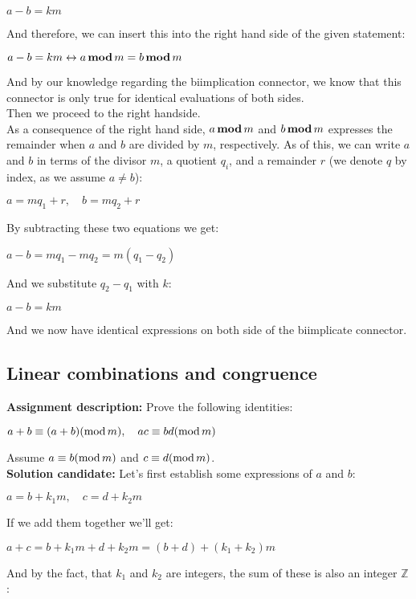 \documentclass{report}
\newcommand{\cent}[1]{\begin{center}#1\end{center}}
\newcommand{\doubleZ}{\mathbb{Z}}
\newcommand{\assignmentDescription}{\textbf{Assignment description: }}
\newcommand{\solution}{\textbf{Solution candidate: }}
\newcommand{\QED}{\boxed{}}
\newcommand{\modInline}{\text{mod\,}}
\newcommand{\modFunc}{\text{\,\textbf{mod}\,}}
\begin{document}
 	\cent{$a-b = km$}
 	
 	And therefore, we can insert this into the right hand side of the given statement:
 	
 	\cent{$a-b=km \leftrightarrow a \modFunc m = b \modFunc m$}
 	
 	And by our knowledge regarding the biimplication connector, we know that this connector is only true for identical evaluations of both sides.\\
 	
 	Then we proceed to the right handside.\\
 	
 	As a consequence of the right hand side, $a \modFunc m$ and $b \modFunc m$ expresses the remainder when $a$ and $b$ are divided by $m$, respectively. As of this, we can write $a$ and $b$ in terms of the divisor $m$, a quotient $q_i$, and a remainder $r$ (we denote $q$ by index, as we assume $a\neq b$):
 	
 	\cent{$a = m q_1 + r, \quad b = m q_2 + r$}
	
	By subtracting these two equations we get:
	
	\cent{$a - b = mq_1 - mq_2 = m(q_1 - q_2)$}
	
	And we substitute $q_2 -q_1$ with $k$:
	
	\cent{$a-b=km$}
	
	
	And we now have identical expressions on both side of the biimplicate connector.\\
	\QED
	
	\subsection{Linear combinations and congruence}
	
	\assignmentDescription
	Prove the following identities:
	
	\cent{$a+b \equiv (a+b) (\modInline m), \quad ac \equiv bd (\modInline m)$}
	
	Assume $a\equiv b (\modInline m)$ and $c \equiv d (\modInline m)$.\\
	
	\solution
	Let's first establish some expressions of $a$ and $b$:
	
	\cent{$a = b + k_1m, \quad c = d + k_2 m$}
	
	If we add them together we'll get:
	
	\cent{$a +c  = b + k_1m + d + k_2m = (b+d) + (k_1+k_2)m$}
	
	And by the fact, that $k_1$ and $k_2$ are integers, the sum of these is also an integer $\doubleZ$:
	
\end{document}
